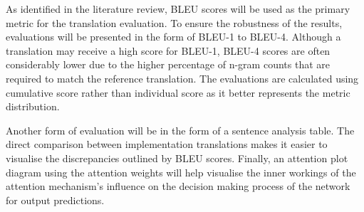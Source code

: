 As identified in the literature review, \acrshort{BLEU} scores will be used as the primary metric for the translation evaluation. To ensure the robustness of the results, evaluations will be presented in the form of \acrshort{BLEU}-1 to \acrshort{BLEU}-4. Although a translation may receive a high score for \acrshort{BLEU}-1, \acrshort{BLEU}-4 scores are often considerably lower due to the higher percentage of n-gram counts that are required to match the reference translation. The evaluations are calculated using cumulative score rather than individual score as it better represents the metric distribution. 

Another form of evaluation will be in the form of a sentence analysis table. The direct comparison between implementation translations makes it easier to visualise the discrepancies outlined by \acrshort{BLEU} scores.
Finally, an attention plot diagram using the attention weights will help visualise the inner workings of the attention mechanism's influence on the decision making process of the network for output predictions. 
